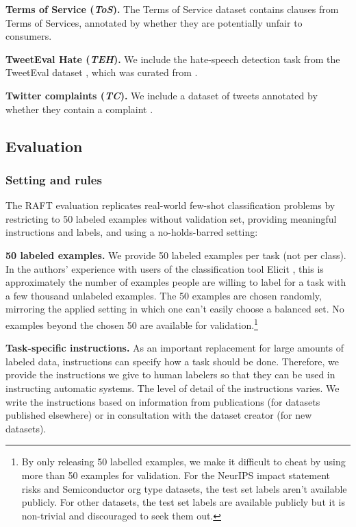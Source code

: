 \documentclass{article}
\newcommand{\name}{\textsc{RAFT}}
\begin{document}
\textbf{Terms of Service (\textit{ToS}).} The Terms of Service dataset \citep{Lippi_2019} contains clauses from Terms of Services, annotated by whether they are potentially unfair to consumers.

\textbf{TweetEval Hate (\textit{TEH}).} We include the hate-speech detection task from the TweetEval dataset \citep{barbieri-etal-2020-tweeteval}, which was curated from \citet{basile-etal-2019-semeval}.

\textbf{Twitter complaints (\textit{TC}).} We include a dataset of tweets annotated by whether they contain a complaint \citep{preotiuc-pietro-etal-2019-automatically}.

\subsection{Evaluation}

\subsubsection{Setting and rules}

The \name{} evaluation replicates real-world few-shot classification problems by restricting to 50 labeled examples without validation set, providing meaningful instructions and labels, and using a no-holds-barred setting:

\textbf{50 labeled examples.} We provide 50 labeled examples per task (not per class). In the authors' experience with users of the classification tool Elicit \citep{elicit}, this is approximately the number of examples people are willing to label for a task with a few thousand unlabeled examples. The 50 examples are chosen randomly, mirroring the applied setting in which one can't easily choose a balanced set. No examples beyond the chosen 50 are available for validation.\footnote{By only releasing 50 labelled examples, we make it difficult to cheat by using more than 50 examples for validation. For the NeurIPS impact statement risks and Semiconductor org type datasets, the test set labels aren't available publicly. For other datasets, the test set labels are available publicly but it is non-trivial and discouraged to seek them out.}

\textbf{Task-specific instructions.} As an important replacement for large amounts of labeled data, instructions can specify how a task should be done. Therefore, we provide the instructions we give to human labelers so that they can be used in instructing automatic systems. The level of detail of the instructions varies. We write the instructions based on information from publications (for datasets published elsewhere) or in consultation with the dataset creator (for new datasets).
\end{document}
